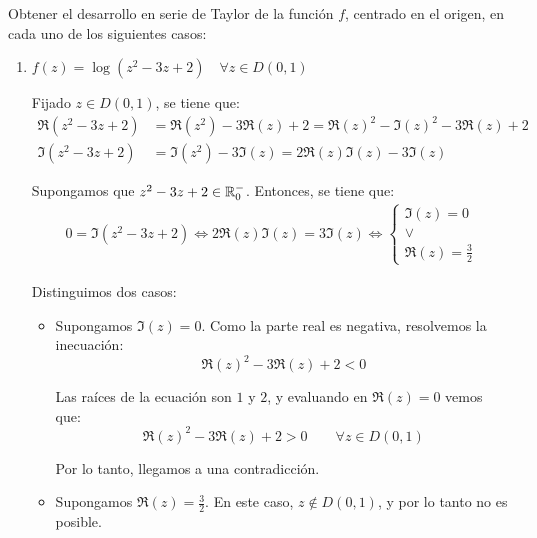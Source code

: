 \begin{ejercicio}
    Obtener el desarrollo en serie de Taylor de la función $f$, centrado en el origen, en cada uno de los siguientes casos:
    \begin{enumerate}
        \item $f(z) = \log(z^2 - 3z + 2) \quad \forall z \in D(0,1)$
        
        Fijado $z\in D(0,1)$, se tiene que:
        \begin{align*}
            \Re(z^2 - 3z + 2) &= \Re(z^2) - 3\Re(z) + 2
            = \Re(z)^2-\Im(z)^2 - 3\Re(z) + 2\\
            \Im(z^2 - 3z + 2) &= \Im(z^2) - 3\Im(z) = 2\Re(z)\Im(z) - 3\Im(z)
        \end{align*}

        Supongamos que $z^2 - 3z + 2 \in \mathbb{R}^-_0$. Entonces, se tiene que:
        \begin{align*}
            0 = \Im(z^2 - 3z + 2) \iff 2\Re(z)\Im(z) = 3\Im(z)\iff \left\{
            \begin{array}{c}
                \Im(z) = 0\\
                \lor\\
                \Re(z) = \frac{3}{2}
            \end{array}\right.
        \end{align*}
        
        Distinguimos dos casos:
        \begin{itemize}
            \item Supongamos $\Im(z) = 0$. Como la parte real es negativa, resolvemos la inecuación:
            \begin{equation*}
                \Re(z)^2-3\Re(z)+2<0
            \end{equation*}

            Las raíces de la ecuación son $1$ y $2$, y evaluando en $\Re(z)=0$ vemos que:
            \begin{equation*}
                \Re(z)^2-3\Re(z)+2>0\qquad \forall z\in D(0,1)
            \end{equation*}

            Por lo tanto, llegamos a una contradicción.

            \item Supongamos $\Re(z) = \frac{3}{2}$. En este caso, $z\notin D(0,1)$, y por lo tanto no es posible.
        \end{itemize}


\end{enumerate}
\end{ejercicio}
